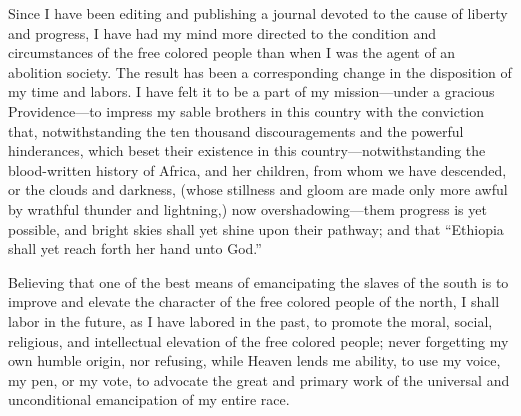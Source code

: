 Since I have been editing and publishing a journal devoted to the cause
of liberty and progress, I have had my mind more directed to the
condition and circumstances of the free colored people than when I was
the agent of an abolition society. The result has been a corresponding
change in the disposition of my time and labors. I have felt it to be a
part of my mission---under a gracious Providence---to impress my sable
brothers in this country with the conviction that, notwithstanding the
ten thousand discouragements and the powerful hinderances, which beset
their existence in this country---notwithstanding the blood-written
history of Africa, and her children, from whom we have descended, or the
clouds and darkness, (whose stillness and gloom are made only more awful
by wrathful thunder and lightning,) now overshadowing---them progress is
yet possible, and bright skies shall yet shine upon their pathway; and
that ``Ethiopia shall yet reach forth her hand unto God.''

Believing that one of the best means of emancipating the slaves of the
south is to improve and elevate the character of the free colored people
of the north, {}I shall labor in the future, as I have labored in the
past, to promote the moral, social, religious, and intellectual
elevation of the free colored people; never forgetting my own humble
origin, nor refusing, while Heaven lends me ability, to use my voice, my
pen, or my vote, to advocate the great and primary work of the universal
and unconditional emancipation of my entire race.
